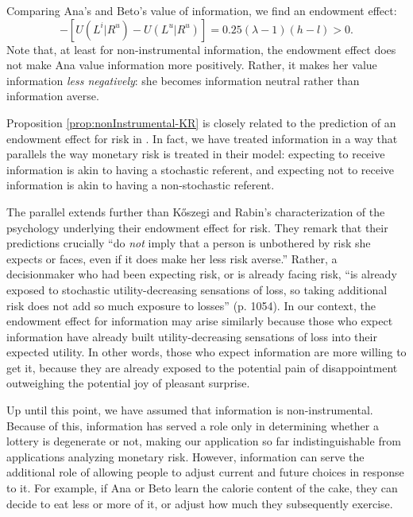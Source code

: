 Comparing Ana's and Beto's value of information, we find an endowment effect:
\begin{equation*}
  [U(L^i|R^i)-U(L^u|R^i)]-[U(L^i|R^u)-U(L^u|R^u)]=0.25(\lambda-1)(h-l)>0.
\end{equation*}
Note that, at least for non-instrumental information, the endowment effect does not make Ana value information more positively. Rather, it makes her value information \emph{less negatively}: she becomes information neutral rather than information averse.

Proposition \ref{prop:nonInstrumental-KR} is closely related to the prediction of an endowment effect for risk in \citet{koszegiReferenceDependentRiskAttitudes2007}. In fact, we have treated information in a way that parallels the way monetary risk is treated in their model: expecting to receive information is akin to having a stochastic referent, and expecting not to receive information is akin to having a non-stochastic referent.

The parallel extends further than Kőszegi and Rabin’s characterization of the psychology underlying their endowment effect for risk. They remark that their predictions crucially \enquote{do \emph{not} imply that a person is unbothered by risk she expects or faces, even if it does make her less risk averse.} Rather, a decisionmaker who had been expecting risk, or is already facing risk, \enquote{is already exposed to stochastic utility-decreasing sensations of loss, so taking additional risk does not add so much exposure to losses} (p. 1054). In our context, the endowment effect for information may arise similarly because those who expect information have already built utility-decreasing sensations of loss into their expected utility. In other words, those who expect information are more willing to get it, because they are already exposed to the potential pain of disappointment outweighing the potential joy of pleasant surprise.

\FloatBarrier

Up until this point, we have assumed that information is non-instrumental. Because of this, information has served a role only in determining whether a lottery is degenerate or not, making our application so far indistinguishable from applications analyzing monetary risk. However, information can serve the additional role of allowing people to adjust current and future choices in response to it. For example, if Ana or Beto learn the calorie content of the cake, they can decide to eat less or more of  it, or adjust how much they subsequently exercise.

